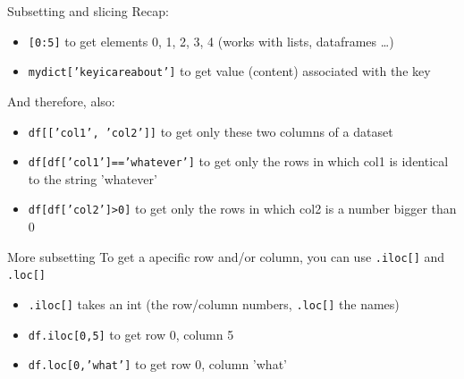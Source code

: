 \documentclass{beamer}
\begin{document}
\begin{frame}{Subsetting and slicing}
Recap:
\begin{itemize}[<+->]
	\item \texttt{[0:5]} to get elements 0, 1, 2, 3, 4 (works with lists, dataframes \ldots)
	\item \texttt{mydict['keyicareabout']} to get value (content) associated with the key
\end{itemize}

\pause

And therefore, also:

\begin{itemize}[<+->]
	\item \texttt{df[['col1', 'col2']]} to get only these two columns of a dataset
	\item \texttt{df[df['col1']=='whatever']} to get only the rows in which col1 is identical to the string 'whatever'
	\item \texttt{df[df['col2']>0]} to get only the rows in which col2 is a number bigger than 0
\end{itemize}


\end{frame}



\begin{frame}{More subsetting}
	To get a apecific row and/or column, you can use \texttt{.iloc[]} and \texttt{.loc[]}
\begin{itemize}[<+->]
	\item \texttt{.iloc[]} takes an int (the row/column numbers, \texttt{.loc[]} the names)
	\item \texttt{df.iloc[0,5]} to get row 0, column 5
	\item \texttt{df.loc[0,'what']} to get row 0, column 'what'
\end{itemize}

\end{frame}
\end{document}
